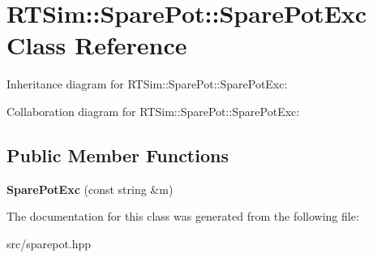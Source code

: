 \hypertarget{classRTSim_1_1SparePot_1_1SparePotExc}{}\section{R\+T\+Sim\+:\+:Spare\+Pot\+:\+:Spare\+Pot\+Exc Class Reference}
\label{classRTSim_1_1SparePot_1_1SparePotExc}


Inheritance diagram for R\+T\+Sim\+:\+:Spare\+Pot\+:\+:Spare\+Pot\+Exc\+:


Collaboration diagram for R\+T\+Sim\+:\+:Spare\+Pot\+:\+:Spare\+Pot\+Exc\+:
\subsection*{Public Member Functions}
\begin{DoxyCompactItemize}
\item 
{\bfseries Spare\+Pot\+Exc} (const string \&m)\hypertarget{classRTSim_1_1SparePot_1_1SparePotExc_a6d301119e30a57cd659012f6b3198041}{}\label{classRTSim_1_1SparePot_1_1SparePotExc_a6d301119e30a57cd659012f6b3198041}

\end{DoxyCompactItemize}


The documentation for this class was generated from the following file\+:\begin{DoxyCompactItemize}
\item 
src/sparepot.\+hpp\end{DoxyCompactItemize}
